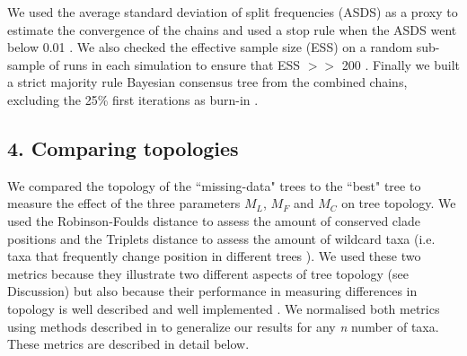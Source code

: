 \documentclass[10pt,letterpaper]{article}
\begin{document}
We used the average standard deviation of split frequencies (ASDS) as a proxy to estimate the convergence of the chains and used a stop rule when the ASDS went below 0.01 \cite{Ronquist2012mrbayes}. We also checked the effective sample size (ESS) on a random sub-sample of runs in each simulation to ensure that ESS $>>$ 200 \cite{drummond2006ess}. Finally we built a strict majority rule Bayesian consensus tree from the combined chains, excluding the 25\% first iterations as burn-in \cite{Ronquist2012mrbayes}.


\subsection*{4. Comparing topologies}
We compared the topology of the ``missing-data" trees to the ``best" tree to measure the effect of the three parameters $M_{L}$, $M_{F}$ and $M_{C}$ on tree topology. We used the Robinson-Foulds distance \cite{RF1981} to assess the amount of conserved clade positions and the Triplets distance \cite{dobson1975triplets} to assess the amount of wildcard taxa (i.e. taxa that frequently change position in different trees \cite{kearneyfragmentary2002}). We used these two metrics because they illustrate two different aspects of tree topology (see Discussion) but also because their performance in measuring differences in topology is well described \cite{Kuhner04112014} and well implemented \cite{Bogdanowicz2012}. We normalised both metrics using methods described in \cite{Bogdanowicz2012} to generalize our results for any \textit{n} number of taxa. These metrics are described in detail below.
\end{document}
